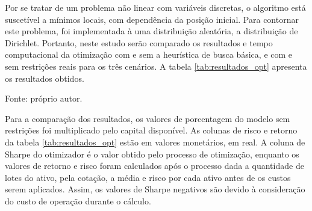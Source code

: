         \ipar Por se tratar de um problema não linear com variáveis discretas, o algoritmo está suscetível a mínimos locais, com dependência da posição inicial. Para contornar este problema, foi implementada à uma distribuição aleatória, a distribuição de Dirichlet. Portanto, neste estudo serão comparado os resultados e tempo computacional da otimização com e sem a heurística de busca básica, e com e sem restrições reais para os três cenários. A tabela \ref{tab:resultados_opt} apresenta os resultados obtidos.

        \begin{table}[htbp]
            \centering
            \caption{Resultados da otimização para os três cenários}
            \label{tab:resultados_opt}
            \par \footnotesize Fonte: próprio autor.
        \end{table}

        \ipar Para a comparação dos resultados, os valores de porcentagem do modelo sem restrições foi multiplicado pelo capital disponível. As colunas de risco e retorno da tabela \ref{tab:resultados_opt} estão em valores monetários, em real. A coluna de Sharpe do otimizador é o valor obtido pelo processo de otimização, enquanto os valores de retorno e risco foram calculados após o processo dada a quantidade de lotes do ativo, pela cotação, a média e risco por cada ativo antes de os custos serem aplicados. Assim, os valores de Sharpe negativos são devido à consideração do custo de operação durante o cálculo. 

